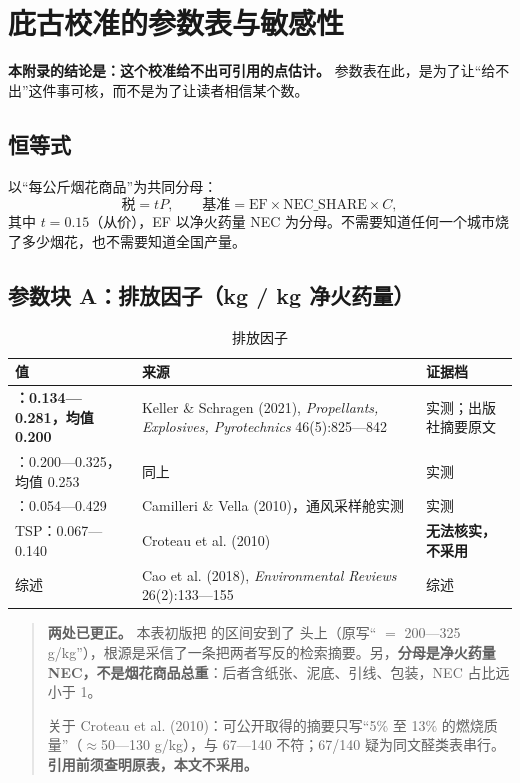 \section{庇古校准的参数表与敏感性}\label{app:calibration}

\textbf{本附录的结论是：这个校准给不出可引用的点估计。} 参数表在此，是为了让“给不出”这件事可核，而不是为了让读者相信某个数。

\subsection{恒等式}

以“每公斤烟花商品”为共同分母：
\[
\text{税}=tP,\qquad \text{基准}=\mathrm{EF}\times\mathrm{NEC\_SHARE}\times C,
\]
其中 $t=0.15$（从价），EF 以净火药量 NEC 为分母。不需要知道任何一个城市烧了多少烟花，也不需要知道全国产量。

\subsection{参数块 A：排放因子（kg  / kg 净火药量）}

\begin{table}[H]
\centering
\caption{排放因子}
\label{tab:ef}
\small
\begin{tabular}{L{4.6cm}L{6.0cm}L{3.4cm}}
\toprule
\textbf{值} & \textbf{来源} & \textbf{证据档} \\
\midrule
\textbf{：0.134—0.281，均值 0.200} & Keller \& Schragen (2021), \emph{Propellants, Explosives, Pyrotechnics} 46(5):825—842 & 实测；出版社摘要原文 \\
：0.200—0.325，均值 0.253 & 同上 & 实测 \\
：0.054—0.429 & Camilleri \& Vella (2010)，通风采样舱实测 & 实测 \\
TSP：0.067—0.140 & Croteau et al. (2010) & \textbf{无法核实，不采用} \\
综述 & Cao et al. (2018), \emph{Environmental Reviews} 26(2):133—155 & 综述 \\
\bottomrule
\end{tabular}
\end{table}

\begin{quote}
\textbf{两处已更正。} 本表初版把  的区间安到了  头上（原写“ $=$ 200—325 g/kg”），根源是采信了一条把两者写反的检索摘要。另，\textbf{分母是净火药量 NEC，不是烟花商品总重}：后者含纸张、泥底、引线、包装，NEC 占比远小于 1。

关于 Croteau et al. (2010)：可公开取得的摘要只写“5\% 至 13\% 的燃烧质量”（$\approx$50—130 g/kg），与 67—140 不符；67/140 疑为同文醛类表串行。\textbf{引用前须查明原表，本文不采用。}
\end{quote}

